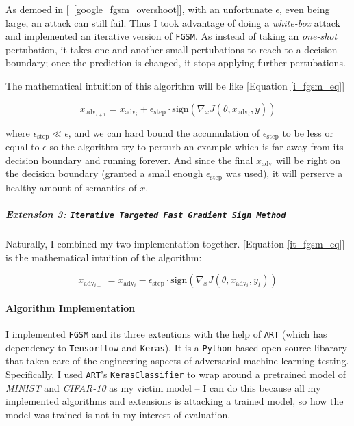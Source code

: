 \documentclass[11pt]{article}
\newcommand{\ilc}{\texttt}
\begin{document}
As demoed in [\figurename{\ \ref{google_fgsm_overshoot}}], with an unfortunate $\epsilon$, even being large, an attack can still fail. Thus I took advantage of doing a \textit{white-box} attack and implemented an iterative version of \ilc{FGSM}. As instead of taking an \textit{one-shot} pertubation, it takes one and another small pertubations to reach to a decision boundary; once the prediction is changed, it stops applying further pertubations.

The mathematical intuition of this algorithm will be like [Equation \ref{i_fgsm_eq}]

\begin{equation}
    x_{\text{adv}_{i+1}} = x_{\text{adv}_{i}} + \epsilon_{\text{step}} \cdot \text{sign}(\nabla_x J(\theta, x_{\text{adv}_{i}}, y))
    \label{i_fgsm_eq}
\end{equation}

where $\epsilon_{\text{step}} \ll \epsilon$, and we can hard bound the accumulation of $\epsilon_{\text{step}}$ to be less or equal to $\epsilon$ so the algorithm try to perturb an example which is far away from its decision boundary and running forever. And since the final $x_{\text{adv}} $ will be right on the decision boundary (granted a small enough $\epsilon_{\text{step}}$ was used), it will perserve a healthy amount of semantics of $x$.

\subparagraph{Extension 3: \ilc{Iterative Targeted Fast Gradient Sign Method}}

Naturally, I combined my two implementation together. [Equation \ref{it_fgsm_eq}] is the mathematical intuition of the algorithm:

\begin{equation}
    x_{\text{adv}_{i+1}} = x_{\text{adv}_{i}} - \epsilon_{\text{step}} \cdot \text{sign}(\nabla_x J(\theta, x_{\text{adv}_{i}}, y_t))
    \label{it_fgsm_eq}
\end{equation}

\paragraph{Algorithm Implementation}\label{fgsm_imp}

I implemented \ilc{FGSM} and its three extentions with the help of \ilc{ART}\cite{cite:art} (which has dependency to \ilc{Tensorflow} and \ilc{Keras}). It is a \ilc{Python}-based open-source libarary that taken care of the engineering aspects of adversarial machine learning testing. Specifically, I used \ilc{ART}'s \ilc{KerasClassifier} to wrap around a pretrained model of \textit{MINIST} and \textit{CIFAR-10} as my victim model -- I can do this because all my implemented algorithms and extensions is attacking a trained model, so how the model was trained is not in my interest of evaluation.\newline
\end{document}
